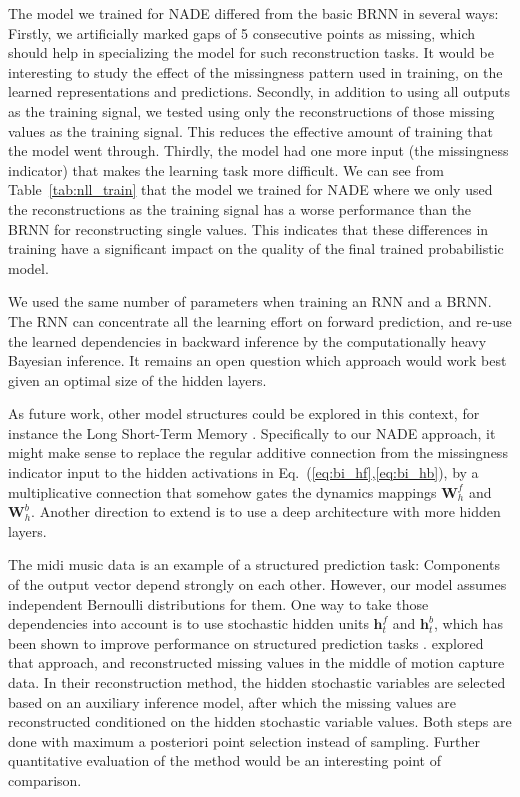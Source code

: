 \documentclass{article}
\begin{document}
The model we trained for NADE differed from the basic BRNN in several ways: 
Firstly, we artificially marked gaps of 5 consecutive points as missing, which 
should help in specializing the model for such reconstruction tasks. 
It would be interesting to study the effect of the missingness pattern used in training, on the learned representations and predictions. Secondly, in addition to using all outputs as the training signal, 
we tested using only the reconstructions of those missing values as the training signal. This reduces the effective amount of training that the 
model went through. Thirdly, the model had one more input (the missingness 
indicator) that makes the learning task more difficult.
We can see from Table~\ref{tab:nll_train} that the model we trained for NADE
where we only used the reconstructions as the training signal has a worse
performance than the BRNN for reconstructing single values. This indicates
that these differences in training have a significant impact on the quality
of the final trained probabilistic model.

We used the same number of parameters when training an RNN and a BRNN. The RNN can 
concentrate all the learning effort on forward prediction, and re-use the 
learned dependencies in backward inference by the computationally heavy 
Bayesian inference. It remains an open question which approach would work best 
given an optimal size of the hidden layers.

As future work, other model structures could be explored in this context, for 
instance the Long Short-Term Memory \citep{hochreiter1997long}. Specifically to 
our NADE approach, it might make sense to replace the regular additive 
connection from the missingness indicator input to the hidden activations in Eq.~(\ref{eq:bi_hf},\ref{eq:bi_hb}), by a 
multiplicative connection that somehow gates the dynamics mappings $\mathbf{W}_h^f$ and $\mathbf{W}_h^b$. Another direction to extend is to use a deep architecture with more hidden layers.

The midi music data is an example of a structured prediction task: Components 
of the output vector depend strongly on each other. However, our model assumes 
independent Bernoulli distributions for them. One way to take those dependencies 
into account is to use stochastic hidden units $\mathbf{h}_t^f$ and $\mathbf{h}_t^b$, 
which has been shown to improve performance on structured 
prediction tasks \citep{Raiko2015techniques}.
\citet{bayer2014learning} explored that approach, and reconstructed missing values in the middle of motion capture data. In their reconstruction method, the hidden stochastic variables are selected based on an auxiliary inference model, after which the missing values are reconstructed conditioned on the hidden stochastic variable values. Both steps are done with maximum a posteriori point selection instead of sampling. Further quantitative evaluation of the method would be an interesting point of comparison.
\end{document}
